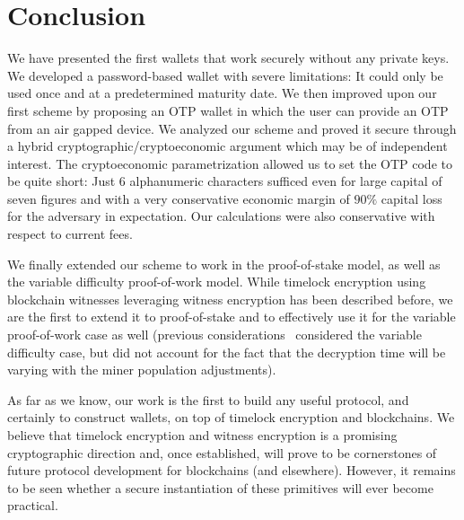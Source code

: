\section{Conclusion}

We have presented the first wallets that work securely without any private
keys. We developed a password-based wallet with severe limitations: It could
only be used once and at a predetermined maturity date. We then improved upon
our first scheme by proposing an OTP wallet in which the user can provide an
OTP from an air gapped device. We analyzed our scheme and proved it secure
through a hybrid cryptographic/cryptoeconomic argument which may be of
independent interest. The cryptoeconomic parametrization allowed us to
set the OTP code to be quite short: Just $6$ alphanumeric characters sufficed
even for large capital of seven figures and with a very conservative economic
margin of $90\%$ capital loss for the adversary in expectation. Our calculations
were also conservative with respect to current fees.

We finally extended our scheme to work in the proof-of-stake model, as well
as the variable difficulty proof-of-work model. While timelock encryption
using blockchain witnesses leveraging witness encryption has been described
before, we are the first to extend it to proof-of-stake and to effectively
use it for the variable proof-of-work case as well (previous
considerations~\cite{timelock-bitcoin} considered the variable difficulty
case, but did not account for the fact that the decryption time will be
varying with the miner population adjustments).

As far as we know, our work is the first to build any useful protocol,
and certainly to construct wallets, on top of timelock encryption and
blockchains. We believe that timelock encryption and witness encryption
is a promising cryptographic direction and, once established, will prove
to be cornerstones of future protocol development for blockchains (and
elsewhere). However, it remains to be seen whether a secure instantiation of
these primitives will ever become practical.

